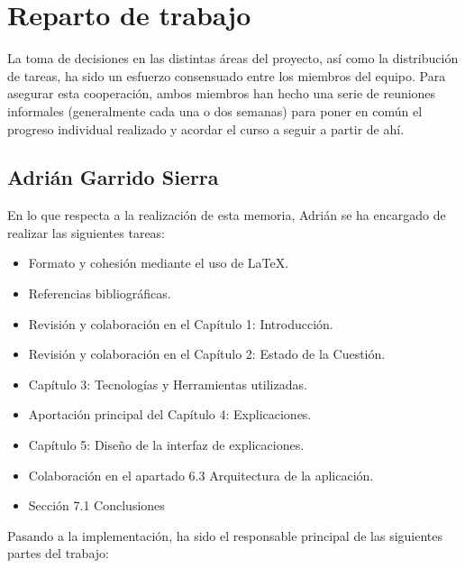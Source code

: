 \chapter{Reparto de trabajo}
\label{Appendix:Key1}

La toma de decisiones en las distintas áreas del proyecto, así como la distribución de tareas, ha sido un esfuerzo consensuado entre los miembros del equipo. Para asegurar esta cooperación, ambos miembros han hecho una serie de reuniones informales (generalmente cada una o dos semanas) para poner en común el progreso individual realizado y acordar el curso a seguir a partir de ahí.

\section{Adrián Garrido Sierra}

En lo que respecta a la realización de esta memoria, Adrián se ha encargado de realizar las siguientes tareas:

\begin{itemize}
\item Formato y cohesión mediante el uso de LaTeX.

\item Referencias bibliográficas.

\item Revisión y colaboración en el Capítulo 1: Introducción.

\item Revisión y colaboración en el Capítulo 2: Estado de la Cuestión.

\item Capítulo 3: Tecnologías y Herramientas utilizadas.

\item Aportación principal del Capítulo 4: Explicaciones.

\item Capítulo 5: Diseño de la interfaz de explicaciones.

\item Colaboración en el apartado 6.3 Arquitectura de la aplicación.

\item Sección 7.1 Conclusiones\\

\end{itemize}

Pasando a la implementación, ha sido el responsable principal de las siguientes partes del trabajo:


